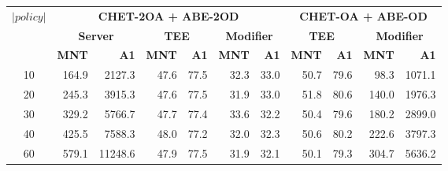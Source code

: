 \begin{tabular}{c rr rr rr rr rr}
\toprule
\multirow{3}{*}{$|policy|$} & \multicolumn{6}{c}{\textbf{CHET-2OA + ABE-2OD}} & \multicolumn{4}{c}{\textbf{CHET-OA + ABE-OD}} \\
\cmidrule(lr){2-7}\cmidrule(lr){8-11}
 & \multicolumn{2}{c}{\textbf{Server}} & \multicolumn{2}{c}{\textbf{TEE}} & \multicolumn{2}{c}{\textbf{Modifier}} & \multicolumn{2}{c}{\textbf{TEE}} & \multicolumn{2}{c}{\textbf{Modifier}} \\
\cmidrule(lr){2-3}\cmidrule(lr){4-5}\cmidrule(lr){6-7}\cmidrule(lr){8-9}\cmidrule(lr){10-11}
 & \textbf{MNT} & \textbf{A1} & \textbf{MNT} & \textbf{A1} & \textbf{MNT} & \textbf{A1} & \textbf{MNT} & \textbf{A1} & \textbf{MNT} & \textbf{A1} \\
\midrule
10 & 164.9 & 2127.3 & 47.6 & 77.5 & 32.3 & 33.0 & 50.7 & 79.6 & 98.3 & 1071.1 \\
20 & 245.3 & 3915.3 & 47.6 & 77.5 & 31.9 & 33.0 & 51.8 & 80.6 & 140.0 & 1976.3 \\
30 & 329.2 & 5766.7 & 47.7 & 77.4 & 33.6 & 32.2 & 50.4 & 79.6 & 180.2 & 2899.0 \\
40 & 425.5 & 7588.3 & 48.0 & 77.2 & 32.0 & 32.3 & 50.6 & 80.2 & 222.6 & 3797.3 \\
60 & 579.1 & 11248.6 & 47.9 & 77.5 & 31.9 & 32.1 & 50.1 & 79.3 & 304.7 & 5636.2 \\
\bottomrule
\end{tabular}
